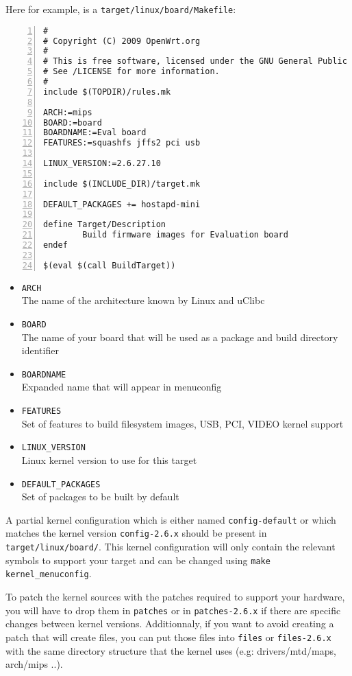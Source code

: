 Here for example, is a \texttt{target/linux/board/Makefile}:

\begin{Verbatim}[frame=single,numbers=left]
#
# Copyright (C) 2009 OpenWrt.org
#
# This is free software, licensed under the GNU General Public License v2.
# See /LICENSE for more information.
#
include $(TOPDIR)/rules.mk

ARCH:=mips
BOARD:=board
BOARDNAME:=Eval board
FEATURES:=squashfs jffs2 pci usb

LINUX_VERSION:=2.6.27.10

include $(INCLUDE_DIR)/target.mk

DEFAULT_PACKAGES += hostapd-mini

define Target/Description
        Build firmware images for Evaluation board
endef

$(eval $(call BuildTarget))
\end{Verbatim}

\begin{itemize}
    \item \texttt{ARCH} \\
        The name of the architecture known by Linux and uClibc
    \item \texttt{BOARD} \\
        The name of your board that will be used as a package and build directory identifier
    \item \texttt{BOARDNAME} \\
        Expanded name that will appear in menuconfig
    \item \texttt{FEATURES} \\
        Set of features to build filesystem images, USB, PCI, VIDEO kernel support
    \item \texttt{LINUX\_VERSION} \\
        Linux kernel version to use for this target
    \item \texttt{DEFAULT\_PACKAGES} \\
        Set of packages to be built by default
\end{itemize}

A partial kernel configuration which is either named \texttt{config-default} or which matches the kernel version \texttt{config-2.6.x} should be present in \texttt{target/linux/board/}.
This kernel configuration will only contain the relevant symbols to support your target and can be changed using \texttt{make kernel\_menuconfig}.

To patch the kernel sources with the patches required to support your hardware, you will have to drop them in \texttt{patches} or in \texttt{patches-2.6.x} if there are specific
changes between kernel versions. Additionnaly, if you want to avoid creating a patch that will create files, you can put those files into \texttt{files} or \texttt{files-2.6.x}
with the same directory structure that the kernel uses (e.g: drivers/mtd/maps, arch/mips ..).

